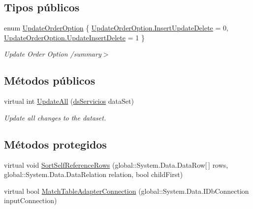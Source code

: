 \subsection*{Tipos públicos}
\begin{DoxyCompactItemize}
\item 
enum \hyperlink{class_proyecto___integrador__3_1_1ds_servicios_table_adapters_1_1_table_adapter_manager_a9e1f8ef540de00f735f491b729080797}{Update\-Order\-Option} \{ \hyperlink{class_proyecto___integrador__3_1_1ds_servicios_table_adapters_1_1_table_adapter_manager_a9e1f8ef540de00f735f491b729080797a27b77cb15d3da7ded0250d0001bc6755}{Update\-Order\-Option.\-Insert\-Update\-Delete} = 0, 
\hyperlink{class_proyecto___integrador__3_1_1ds_servicios_table_adapters_1_1_table_adapter_manager_a9e1f8ef540de00f735f491b729080797a894fcc001e51f673d3fb5f3096473dd8}{Update\-Order\-Option.\-Update\-Insert\-Delete} = 1
 \}
\begin{DoxyCompactList}\small\item\em Update Order Option /summary$>$ \end{DoxyCompactList}\end{DoxyCompactItemize}
\subsection*{Métodos públicos}
\begin{DoxyCompactItemize}
\item 
virtual int \hyperlink{class_proyecto___integrador__3_1_1ds_servicios_table_adapters_1_1_table_adapter_manager_a6eacbaae270959be1da079741a9edfac}{Update\-All} (\hyperlink{class_proyecto___integrador__3_1_1ds_servicios}{ds\-Servicios} data\-Set)
\begin{DoxyCompactList}\small\item\em Update all changes to the dataset. \end{DoxyCompactList}\end{DoxyCompactItemize}
\subsection*{Métodos protegidos}
\begin{DoxyCompactItemize}
\item 
virtual void \hyperlink{class_proyecto___integrador__3_1_1ds_servicios_table_adapters_1_1_table_adapter_manager_a5073eeb629932eec59c77138749d3a10}{Sort\-Self\-Reference\-Rows} (global\-::\-System.\-Data.\-Data\-Row\mbox{[}$\,$\mbox{]} rows, global\-::\-System.\-Data.\-Data\-Relation relation, bool child\-First)
\item 
virtual bool \hyperlink{class_proyecto___integrador__3_1_1ds_servicios_table_adapters_1_1_table_adapter_manager_a4ae64aa35a512fc0489b4806bf32e8de}{Match\-Table\-Adapter\-Connection} (global\-::\-System.\-Data.\-I\-Db\-Connection input\-Connection)
\end{DoxyCompactItemize}
